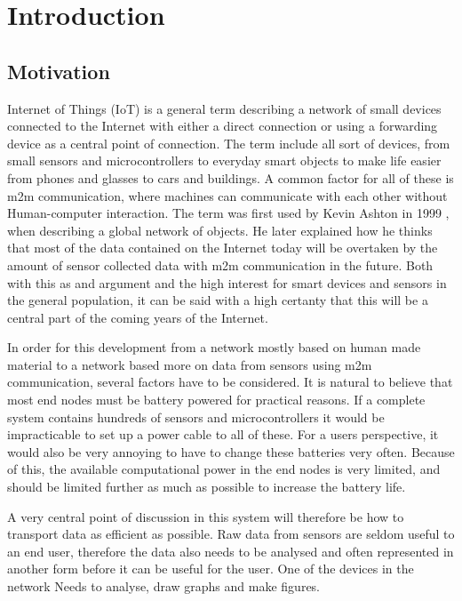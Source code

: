 \chapter{Introduction}
\label{chp:introduction} 


\section{Motivation}

Internet of Things (IoT) is a general term describing a network of small devices connected to the Internet with either a direct connection or using a forwarding device as a central point of connection. The term include all sort of devices, from small sensors and microcontrollers to everyday smart objects to make life easier from phones and glasses to cars and buildings. A common factor for all of these is \gls{m2m} communication, where machines can communicate with each other without Human-computer interaction. The term was first used by Kevin Ashton in 1999 \cite{ashton2009internet}, when describing a global network of objects. He later explained how he thinks that most of the data contained on the Internet today will be overtaken by the amount of sensor collected data with \gls{m2m} communication in the future. Both with this as and argument and the high interest for smart devices and sensors in the general population, it can be said with a high certanty that this will be a central part of the coming years of the Internet. 

In order for this development from a network mostly based on human made material to a network based more on data from sensors using \gls{m2m} communication, several factors have to be considered. It is natural to believe that most end nodes must be battery powered for practical reasons. If a complete system contains hundreds of sensors and microcontrollers it would be impracticable to set up a power cable to all of these. For a users perspective, it would also be very annoying to have to change these batteries very often. Because of this, the available computational power in the end nodes is very limited, and should be limited further as much as possible to increase the battery life. 

A very central point of discussion in this system will therefore be how to transport data as efficient as possible. Raw data from sensors are seldom useful to an end user, therefore the data also needs to be analysed and often represented in another form before it can be useful for the user. One of the devices in the network  Needs to analyse, draw graphs and make figures. 


